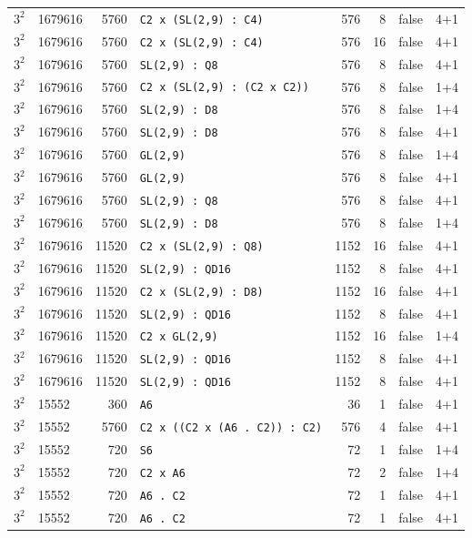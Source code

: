 \begin{longtable}{llrlrrll}
$3^2$ & 1679616 & 5760 & \texttt{C2 x (SL(2,9) : C4)} & 576 & 8 & false & 4+1\\
$3^2$ & 1679616 & 5760 & \texttt{C2 x (SL(2,9) : C4)} & 576 & 16 & false & 4+1\\
$3^2$ & 1679616 & 5760 & \texttt{SL(2,9) : Q8} & 576 & 8 & false & 4+1\\
$3^2$ & 1679616 & 5760 & \texttt{C2 x (SL(2,9) : (C2 x C2))} & 576 & 8 & false & 1+4\\
$3^2$ & 1679616 & 5760 & \texttt{SL(2,9) : D8} & 576 & 8 & false & 1+4\\
$3^2$ & 1679616 & 5760 & \texttt{SL(2,9) : D8} & 576 & 8 & false & 4+1\\
$3^2$ & 1679616 & 5760 & \texttt{GL(2,9)} & 576 & 8 & false & 1+4\\
$3^2$ & 1679616 & 5760 & \texttt{GL(2,9)} & 576 & 8 & false & 4+1\\
$3^2$ & 1679616 & 5760 & \texttt{SL(2,9) : Q8} & 576 & 8 & false & 4+1\\
$3^2$ & 1679616 & 5760 & \texttt{SL(2,9) : D8} & 576 & 8 & false & 1+4\\
$3^2$ & 1679616 & 11520 & \texttt{C2 x (SL(2,9) : Q8)} & 1152 & 16 & false & 4+1\\
$3^2$ & 1679616 & 11520 & \texttt{SL(2,9) : QD16} & 1152 & 8 & false & 4+1\\
$3^2$ & 1679616 & 11520 & \texttt{C2 x (SL(2,9) : D8)} & 1152 & 16 & false & 4+1\\
$3^2$ & 1679616 & 11520 & \texttt{SL(2,9) : QD16} & 1152 & 8 & false & 4+1\\
$3^2$ & 1679616 & 11520 & \texttt{C2 x GL(2,9)} & 1152 & 16 & false & 1+4\\
$3^2$ & 1679616 & 11520 & \texttt{SL(2,9) : QD16} & 1152 & 8 & false & 4+1\\
$3^2$ & 1679616 & 11520 & \texttt{SL(2,9) : QD16} & 1152 & 8 & false & 4+1\\
$3^2$ & 15552 & 360 & \texttt{A6} & 36 & 1 & false & 4+1\\
$3^2$ & 15552 & 5760 & \texttt{C2 x ((C2 x (A6 . C2)) : C2)} & 576 & 4 & false & 4+1\\
$3^2$ & 15552 & 720 & \texttt{S6} & 72 & 1 & false & 1+4\\
$3^2$ & 15552 & 720 & \texttt{C2 x A6} & 72 & 2 & false & 1+4\\
$3^2$ & 15552 & 720 & \texttt{A6 . C2} & 72 & 1 & false & 4+1\\
$3^2$ & 15552 & 720 & \texttt{A6 . C2} & 72 & 1 & false & 4+1\\

\end{longtable}
